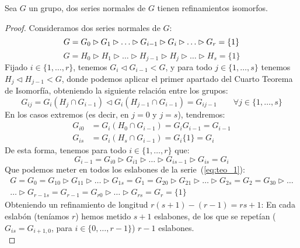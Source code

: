 \begin{teo}
    Sea $G$ un grupo, dos series normales de $G$ tienen refinamientos isomorfos.
    \begin{proof}
        Consideramos dos series normales de $G$:
        \begin{equation}\label{eq:teo_1}
            G = G_0 \rhd G_1 \rhd \ldots \rhd G_{i-1} \rhd G_i \rhd \ldots\rhd G_r = \{1\} \\
        \end{equation}
        \begin{equation}\label{eq:teo_2}
            G = H_0 \rhd H_1 \rhd \ldots \rhd H_{j-1} \rhd H_j \rhd \ldots \rhd H_s = \{1\}
        \end{equation}
        Fijado $i \in \{1,\ldots,r\}$, tenemos $G_i \lhd G_{i-1} < G$, y para todo $j \in \{1,\ldots,s\}$ tenemos $H_j\lhd H_{j-1} < G$, donde podemos aplicar el primer apartado del Cuarto Teorema de Isomorfía, obteniendo la siguiente relación entre los grupos:
        \begin{equation*}
            G_{ij} = G_i(H_j\cap G_{i-1}) \lhd G_i(H_{j-1}\cap G_{i-1}) = G_{ij-1} \qquad \forall j\in \{1, \ldots, s\}
        \end{equation*}
        En los casos extremos (es decir, en $j = 0$ y $j = s$), tendremos:
        \begin{align*}
            G_{i0} &= G_i(H_0\cap G_{i-1}) = G_iG_{i-1} = G_{i-1} \\
            G_{is} &= G_i(H_s\cap G_{i-1}) = G_i \{1\} = G_i
        \end{align*}
        De esta forma, tenemos para todo $i \in \{1,\ldots,r\}$ que:
        \begin{equation*}
            G_{i-1} = G_{i0} \rhd G_{i1} \rhd \ldots \rhd G_{is-1} \rhd G_{is} = G_i
        \end{equation*}
        Que podemos meter en todos los eslabones de la serie~(\ref{eq:teo_1}):
        \begin{multline*}
            G = G_0 = G_{10} \rhd G_{11} \rhd \ldots \rhd G_{1s} = G_1 = G_{20} \rhd G_{21} \rhd \ldots \rhd G_{2s} = G_2 = G_{30} \rhd \ldots  \\
            \ldots \rhd G_{r-1s} = G_{r-1} = G_{r0} \rhd \ldots \rhd G_{rs} = G_r =  \{1\}
        \end{multline*}
        Obteniendo un refinamiento de longitud $r(s+1)-(r-1) = rs + 1$:\newline
        En cada eslabón (teníamos $r$) hemos metido $s+1$ eslabones, de los que se repetían ($G_{is} = G_{i+1,0}$, para $i \in \{0, \ldots, r-1\}$) $r-1$ eslabones.\\


\end{proof}
\end{teo}
